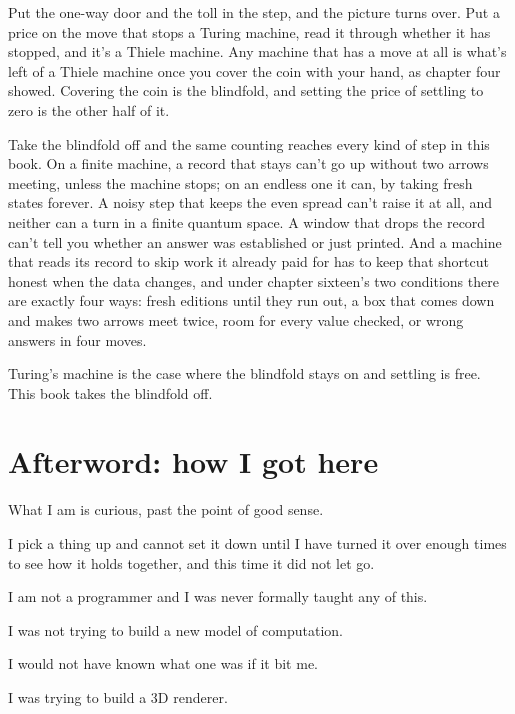 \documentclass[11pt,twoside]{article}
\theoremstyle{thielethm}
\theoremstyle{thieledef}
\theoremstyle{thieledef}
\theoremstyle{thieledef}
\theoremstyle{thielethm}
\theoremstyle{thieleobs}
\theoremstyle{thielethm}
\begin{document}
Put the one-way door and the toll in the step, and the picture turns over. Put a price on the move that stops a Turing machine, read it through whether it has stopped, and it's a Thiele machine. Any machine that has a move at all is what's left of a Thiele machine once you cover the coin with your hand, as chapter four showed. Covering the coin is the blindfold, and setting the price of settling to zero is the other half of it.

Take the blindfold off and the same counting reaches every kind of step in this book. On a finite machine, a record that stays can't go up without two arrows meeting, unless the machine stops; on an endless one it can, by taking fresh states forever. A noisy step that keeps the even spread can't raise it at all, and neither can a turn in a finite quantum space. A window that drops the record can't tell you whether an answer was established or just printed. And a machine that reads its record to skip work it already paid for has to keep that shortcut honest when the data changes, and under chapter sixteen's two conditions there are exactly four ways: fresh editions until they run out, a box that comes down and makes two arrows meet twice, room for every value checked, or wrong answers in four moves.

Turing's machine is the case where the blindfold stays on and settling is free. This book takes the blindfold off.

\section*{Afterword: how I got here}
\label{sec:origin}

What I am is curious, past the point of good sense.

I pick a thing up and cannot set it down until I have turned it over enough times to see how it holds together, and this time it did not let go.

I am not a programmer and I was never formally taught any of this.

I was not trying to build a new model of computation.

I would not have known what one was if it bit me.

I was trying to build a 3D renderer.
\end{document}

